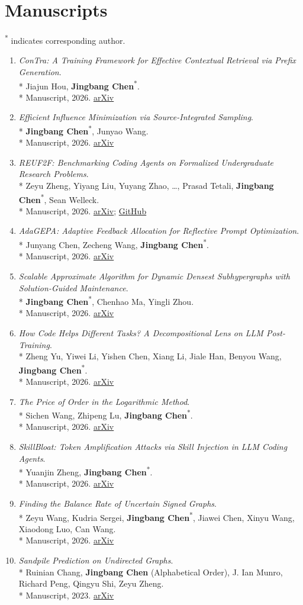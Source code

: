 \documentclass[10pt]{article}
\newcommand{\pub}[4]{%
  \item \begin{minipage}[t]{\linewidth}\raggedright
  \textit{#1}.\\*
  #2\\*
  #3 #4
  \end{minipage}
}
\begin{document}
\section*{Manuscripts}
\textsuperscript{*} indicates corresponding author.
\begin{enumerate}[leftmargin=1.7em,itemsep=4pt,topsep=3pt]
  \pub{ConTra: A Training Framework for Effective Contextual Retrieval via Prefix Generation}
  {Jiajun Hou, \textbf{Jingbang Chen}\textsuperscript{*}.}
  {Manuscript, 2026.}
  { \href{https://arxiv.org/abs/2611.34366}{arXiv}}

  \pub{Efficient Influence Minimization via Source-Integrated Sampling}
  {\textbf{Jingbang Chen}\textsuperscript{*}, Junyao Wang.}
  {Manuscript, 2026.}
  { \href{https://arxiv.org/abs/2611.15949}{arXiv}}

  \pub{REUF2F: Benchmarking Coding Agents on Formalized Undergraduate Research Problems}
  {Zeyu Zheng, Yiyang Liu, Yuyang Zhao, \ldots, Prasad Tetali, \textbf{Jingbang Chen}\textsuperscript{*}, Sean Welleck.}
  {Manuscript, 2026.}
  { \href{https://arxiv.org/abs/2610.27046}{arXiv}; \href{https://github.com/cmu-l3/reuF2F}{GitHub}}

  \pub{AdaGEPA: Adaptive Feedback Allocation for Reflective Prompt Optimization}
  {Junyang Chen, Zecheng Wang, \textbf{Jingbang Chen}\textsuperscript{*}.}
  {Manuscript, 2026.}
  { \href{https://arxiv.org/abs/2609.39927}{arXiv}}

  \pub{Scalable Approximate Algorithm for Dynamic Densest Subhypergraphs with Solution-Guided Maintenance}
  {\textbf{Jingbang Chen}\textsuperscript{*}, Chenhao Ma, Yingli Zhou.}
  {Manuscript, 2026.}
  { \href{https://arxiv.org/abs/2609.39778}{arXiv}}

  \pub{How Code Helps Different Tasks? A Decompositional Lens on LLM Post-Training}
  {Zheng Yu, Yiwei Li, Yishen Chen, Xiang Li, Jiale Han, Benyou Wang, \textbf{Jingbang Chen}\textsuperscript{*}.}
  {Manuscript, 2026.}
  { \href{https://arxiv.org/abs/2609.33845}{arXiv}}

  \pub{The Price of Order in the Logarithmic Method}
  {Sichen Wang, Zhipeng Lu, \textbf{Jingbang Chen}\textsuperscript{*}.}
  {Manuscript, 2026.}
  { \href{https://arxiv.org/abs/2608.06388}{arXiv}}

  \pub{SkillBloat: Token Amplification Attacks via Skill Injection in LLM Coding Agents}
  {Yuanjin Zheng, \textbf{Jingbang Chen}\textsuperscript{*}.}
  {Manuscript, 2026.}
  { \href{https://arxiv.org/abs/2608.21929}{arXiv}}

  \pub{Finding the Balance Rate of Uncertain Signed Graphs}
  {Zeyu Wang, Kudria Sergei, \textbf{Jingbang Chen}\textsuperscript{*}, Jiawei Chen, Xinyu Wang, Xiaodong Luo, Can Wang.}
  {Manuscript, 2026.}
  { \href{https://arxiv.org/abs/2605.17492}{arXiv}}

  \pub{Sandpile Prediction on Undirected Graphs}
  {Ruinian Chang, \textbf{Jingbang Chen} (Alphabetical Order), J. Ian Munro, Richard Peng, Qingyu Shi, Zeyu Zheng.}
  {Manuscript, 2023.}
  { \href{https://arxiv.org/abs/2307.07711}{arXiv}}
\end{enumerate}
\end{document}
